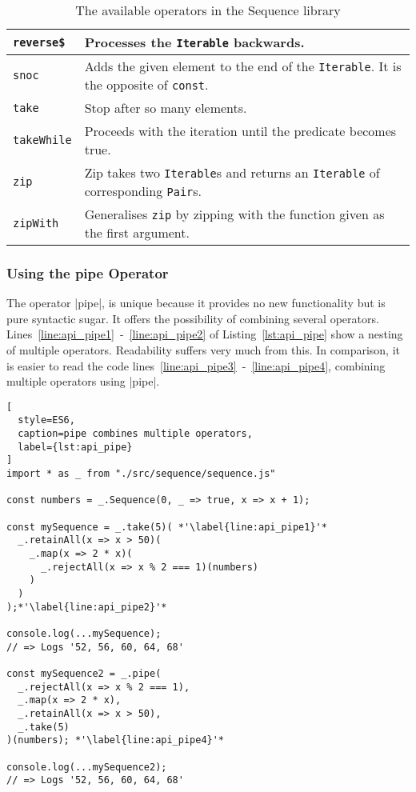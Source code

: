 \begin{table}[H]
\begin{tabularx}{\textwidth}{| l | X |}
    \texttt{reverse\$} & Processes the \texttt{Iterable} backwards. \\ \hline 
    \texttt{snoc} & Adds the given element to the end of the \texttt{Iterable}. It is the opposite of \texttt{const}.\\ \hline 
    \texttt{take} & Stop after so many elements. \\ \hline 
    \texttt{takeWhile} & Proceeds with the iteration until the predicate becomes true. \\ \hline 
    \texttt{zip} & Zip takes two \texttt{Iterable}s and returns an \texttt{Iterable} of corresponding \texttt{Pair}s. \\ \hline 
    \texttt{zipWith} & Generalises \texttt{zip} by zipping with the function given as the first argument. \\ \hline 
  \end{tabularx}
  \caption{The available operators in the Sequence library}
  \label{tab:api_operators}
\end{table}

\subsubsection{Using the pipe Operator} %
\label{subsub:Using the pipe Operator}
The operator |pipe|, is unique because it provides no new functionality but is
pure syntactic sugar. It offers the possibility of combining several operators.
Lines~\ref{line:api_pipe1}~-~\ref{line:api_pipe2} of Listing~\ref{lst:api_pipe}
show a nesting of multiple operators. Readability suffers very much from this.
In comparison, it is easier to read the code
lines~\ref{line:api_pipe3}~-~\ref{line:api_pipe4}, combining multiple operators
using |pipe|. 
\begin{lstlisting}[
  style=ES6,
  caption=pipe combines multiple operators,
  label={lst:api_pipe}
]
import * as _ from "./src/sequence/sequence.js"

const numbers = _.Sequence(0, _ => true, x => x + 1);

const mySequence = _.take(5)( *'\label{line:api_pipe1}'*
  _.retainAll(x => x > 50)(
    _.map(x => 2 * x)(
      _.rejectAll(x => x % 2 === 1)(numbers)
    )
  )
);*'\label{line:api_pipe2}'*

console.log(...mySequence);
// => Logs '52, 56, 60, 64, 68'

const mySequence2 = _.pipe(
  _.rejectAll(x => x % 2 === 1),
  _.map(x => 2 * x),
  _.retainAll(x => x > 50),
  _.take(5)
)(numbers); *'\label{line:api_pipe4}'*

console.log(...mySequence2);
// => Logs '52, 56, 60, 64, 68'
\end{lstlisting}

